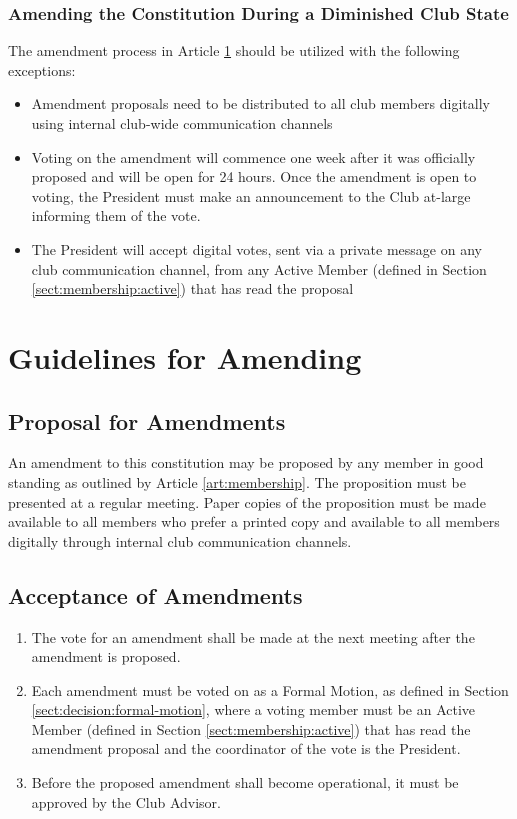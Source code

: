 \documentclass[english,11pt]{article}
\begin{document}
\subsubsection{Amending the Constitution During a Diminished Club State} \label{subsect:reduced:amending}
The amendment process in Article \ref{art:amending} should be utilized with the following exceptions:

\begin{itemize}
    \item Amendment proposals need to be distributed to all club members digitally using internal club-wide communication channels
    \item Voting on the amendment will commence one week after it was officially proposed and will be open for 24 hours.
        Once the amendment is open to voting, the President must make an announcement to the Club at-large informing them of the vote.
    \item The President will accept digital votes, sent via a private message on any club communication channel, from any Active Member (defined in Section \ref{sect:membership:active}) that has read the proposal
\end{itemize}

\section{Guidelines for Amending} \label{art:amending}

\subsection{Proposal for Amendments} \label{sect:amending:proposal}
An amendment to this constitution may be proposed by any member in good standing as outlined by Article \ref{art:membership}.
The proposition must be presented at a regular meeting.
Paper copies of the proposition must be made available to all members who prefer a printed copy and available to all members digitally through internal club communication channels.

\subsection{Acceptance of Amendments} \label{sect:amending:acceptance}
\begin{enumerate}[label=\Alph*.]
    \item The vote for an amendment shall be made at the next meeting after the amendment is proposed.
    \item Each amendment must be voted on as a Formal Motion, as defined in Section \ref{sect:decision:formal-motion}, where a voting member must be an Active Member (defined in Section \ref{sect:membership:active}) that has read the amendment proposal and the coordinator of the vote is the President.
    \item Before the proposed amendment shall become operational, it must be approved by the Club Advisor.
\end{enumerate}
\end{document}
